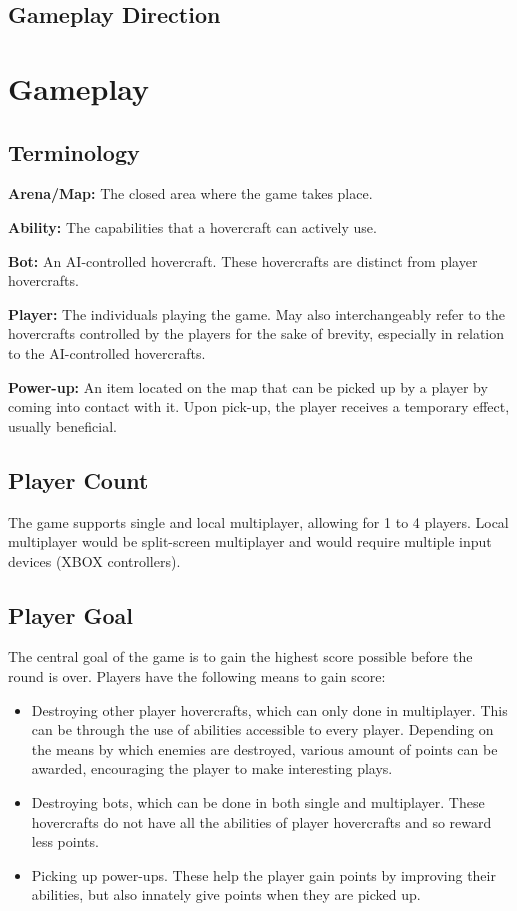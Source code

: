 \documentclass{article}
\theoremstyle{definition}
\begin{document}
\subsection{Gameplay Direction} %

\section{Gameplay}

\subsection{Terminology}

\textbf{Arena/Map:} The closed area where the game takes place.

\textbf{Ability:} The capabilities that a hovercraft can actively use.

\textbf{Bot:} An AI-controlled hovercraft. These hovercrafts are distinct from
player hovercrafts.

\textbf{Player:} The individuals playing the game. May also interchangeably
refer to the hovercrafts controlled by the players for the sake of brevity,
especially in relation to the AI-controlled hovercrafts.

\textbf{Power-up:} An item located on the map that can be picked up by a player
by coming into contact with it. Upon pick-up, the player receives a temporary
effect, usually beneficial.

\subsection{Player Count}

The game supports single and local multiplayer, allowing for 1 to 4 players.
Local multiplayer would be split-screen multiplayer and would require multiple
input devices (XBOX controllers).

\subsection{Player Goal}

The central goal of the game is to gain the highest score possible before the
round is over. Players have the following means to gain score:
\begin{itemize}
  \item Destroying other player hovercrafts, which can only done in
    multiplayer. This can be through the use of abilities accessible to every
    player. Depending on the means by which enemies are destroyed, various
    amount of points can be awarded, encouraging the player to make interesting
    plays.
  \item Destroying bots, which can be done in both single and multiplayer.
    These hovercrafts do not have all the abilities of player hovercrafts and
    so reward less points.
  \item Picking up power-ups. These help the player gain points by improving
    their abilities, but also innately give points when they are picked up.
\end{itemize}
\end{document}
